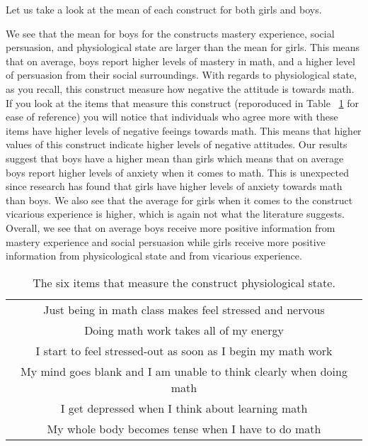 \documentclass[a4paper,12pt,oneside]{book}
\begin{document}
Let us take a look at the mean of each construct for both girls and boys.

\begin{stlog}\end{stlog}

We see that the mean for boys for the constructs mastery experience, social persuasion, and physiological state are larger than the mean for girls. This means that
on average, boys report higher levels of mastery in math, and a higher level of persuasion
from their social surroundings. With regards to physiological state, as you recall, this construct
measure how negative the attitude is towards math. If you look at the items that measure this construct (reporoduced in Table ~\ref{table:physiological} 
for ease of reference) you will notice that individuals who agree more with these items have higher levels of negative feeings towards math. This
means that higher values of this construct indicate higher levels of negative attitudes. Our results suggest that boys have a higher mean than 
girls which means that on average boys report higher levels of anxiety when it comes to math. This is unexpected since research has found that
girls have higher levels of anxiety towards math than boys. We also see that the average for girls when it comes to the construct vicarious 
experience is higher, which is again not what the literature suggests. Overall, we see that on average boys receive more positive information from
mastery experience and social persuasion while girls receive more positive information from physicological state and from vicarious experience.

\begin{table}[!ht]
	\caption{The six items that measure the construct physiological state.} \label{table:physiological}
	\centering
	\begin{tabular}{c}
	\hline
	Just being in math class makes feel stressed and nervous \\ 
	Doing math work takes all of my energy \\ 
	I start to feel stressed-out as soon as I begin my math work \\ 
	My mind goes blank and I am unable to think clearly when doing math \\
	I get depressed when I think about learning math \\ 
	My whole body becomes tense when I have to do math \\
	\hline
	\end{tabular}
\end{table}
\end{document}
